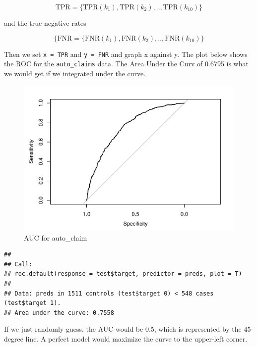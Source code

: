 \documentclass[]{book}
\newenvironment{Shaded}{\begin{snugshade}}{\end{snugshade}}
\newcommand{\DataTypeTok}[1]{\textcolor[rgb]{0.13,0.29,0.53}{#1}}
\newcommand{\KeywordTok}[1]{\textcolor[rgb]{0.13,0.29,0.53}{\textbf{#1}}}
\newcommand{\NormalTok}[1]{#1}
\newcommand{\OperatorTok}[1]{\textcolor[rgb]{0.81,0.36,0.00}{\textbf{#1}}}
\begin{document}
\[\text{TPR} = \{\text{TPR}(k_1), \text{TPR}(k_2), .., \text{TPR}(k_{10})\} \]

and the true negative rates

\[\{\text{FNR} = \{\text{FNR}(k_1), \text{FNR}(k_2), .., \text{FNR}(k_{10})\}\]

Then we set \texttt{x\ =\ TPR} and \texttt{y\ =\ FNR} and graph x against y. The plot below shows the ROC for the \texttt{auto\_claims} data. The Area Under the Curv of 0.6795 is what we would get if we integrated under the curve.

\begin{Shaded}
\end{Shaded}

\begin{figure}
\centering
\includegraphics{Exam-PA-Study-Manual_files/figure-latex/unnamed-chunk-114-1.pdf}
\caption{\label{fig:unnamed-chunk-114}AUC for auto\_claim}
\end{figure}

\begin{verbatim}
## 
## Call:
## roc.default(response = test$target, predictor = preds, plot = T)
## 
## Data: preds in 1511 controls (test$target 0) < 548 cases (test$target 1).
## Area under the curve: 0.7558
\end{verbatim}

If we just randomly guess, the AUC would be 0.5, which is represented by the 45-degree line. A perfect model would maximize the curve to the upper-left corner.
\end{document}
